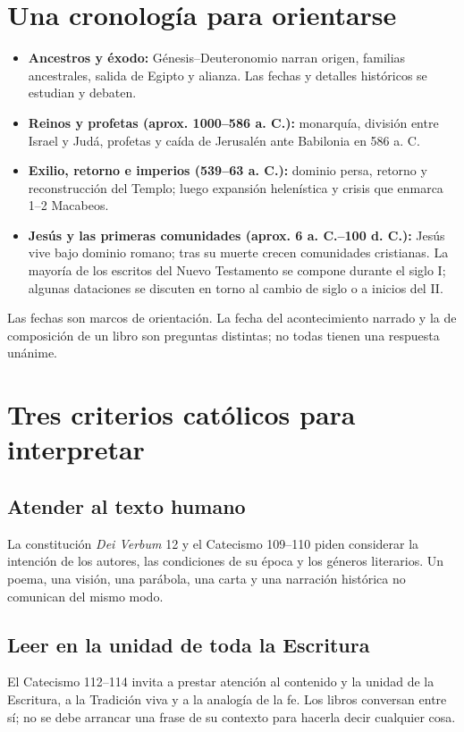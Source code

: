 \documentclass[11pt]{article}
\begin{document}
\section{Una cronología para orientarse}
\begin{itemize}[leftmargin=1.2em]
\item \textbf{Ancestros y éxodo:} Génesis--Deuteronomio narran origen, familias ancestrales, salida de Egipto y alianza. Las fechas y detalles históricos se estudian y debaten.
\item \textbf{Reinos y profetas (aprox. 1000--586 a. C.):} monarquía, división entre Israel y Judá, profetas y caída de Jerusalén ante Babilonia en 586 a. C.
\item \textbf{Exilio, retorno e imperios (539--63 a. C.):} dominio persa, retorno y reconstrucción del Templo; luego expansión helenística y crisis que enmarca 1--2 Macabeos.
\item \textbf{Jesús y las primeras comunidades (aprox. 6 a. C.--100 d. C.):} Jesús vive bajo dominio romano; tras su muerte crecen comunidades cristianas. La mayoría de los escritos del Nuevo Testamento se compone durante el siglo I; algunas dataciones se discuten en torno al cambio de siglo o a inicios del II.
\end{itemize}
Las fechas son marcos de orientación. La fecha del acontecimiento narrado y la de composición de un libro son preguntas distintas; no todas tienen una respuesta unánime.

\section{Tres criterios católicos para interpretar}
\subsection{Atender al texto humano}
La constitución \textit{Dei Verbum} 12 y el Catecismo 109--110 piden considerar la intención de los autores, las condiciones de su época y los géneros literarios. Un poema, una visión, una parábola, una carta y una narración histórica no comunican del mismo modo.

\subsection{Leer en la unidad de toda la Escritura}
El Catecismo 112--114 invita a prestar atención al contenido y la unidad de la Escritura, a la Tradición viva y a la analogía de la fe. Los libros conversan entre sí; no se debe arrancar una frase de su contexto para hacerla decir cualquier cosa.
\end{document}
